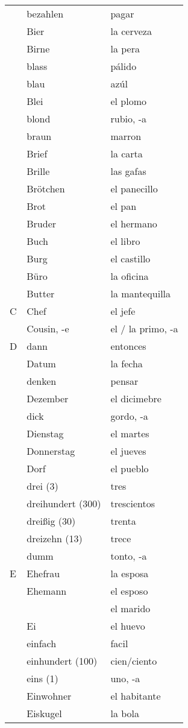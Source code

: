 \documentclass[10pt,spanish]{article}
\begin{document}
\begin{longtable}{p{} p{} | p{}}
& bezahlen & pagar  \\
& Bier & la cerveza  \\
& Birne & la pera  \\
& blass & pálido \\
& blau & azúl \\
& Blei & el plomo  \\
& blond & rubio, -a  \\
& braun & marron  \\
& Brief & la carta  \\
& Brille & las gafas  \\
& Brötchen & el panecillo  \\
& Brot & el pan \\
& Bruder & el hermano  \\
& Buch & el libro  \\
& Burg & el castillo \\
& Büro & la oficina \\
& Butter & la mantequilla  \\
C & Chef & el jefe  \\
& Cousin, -e & el / la primo, -a  \\
D & dann & entonces  \\
& Datum & la fecha  \\
& denken & pensar  \\
& Dezember & el dicimebre  \\
& dick & gordo, -a  \\
& Dienstag & el martes  \\
& Donnerstag & el jueves  \\
& Dorf & el pueblo  \\
& drei (3) & tres  \\
& dreihundert (300) & trescientos \\
& dreißig (30) & trenta  \\
& dreizehn (13) & trece  \\
& dumm & tonto, -a  \\
E & Ehefrau & la esposa  \\
& Ehemann & el esposo \\
& & el marido \\
& Ei & el huevo  \\
& einfach & facil  \\
& einhundert (100) & cien/ciento  \\
& eins (1) & uno, -a  \\
& Einwohner & el habitante \\
& Eiskugel & la bola  \\

\end{longtable}
\end{document}
